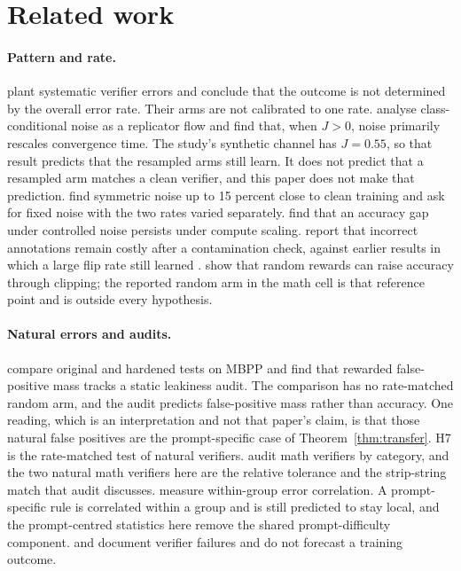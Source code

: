\section{Related work}
\label{sec:related}

\paragraph{Pattern and rate.}
\citet{egashira2026delay} plant systematic verifier errors and conclude that the outcome is not determined by the overall error rate.
Their arms are not calibrated to one rate.
\citet{rad2026rate} analyse class-conditional noise as a replicator flow and find that, when $J > 0$, noise primarily rescales convergence time.
The study's synthetic channel has $J = 0.55$, so that result predicts that the resampled arms still learn.
It does not predict that a resampled arm matches a clean verifier, and this paper does not make that prediction.
\citet{plesner2026noise} find symmetric noise up to 15 percent close to clean training and ask for fixed noise with the two rates varied separately.
\citet{mitsuhashi2026scaling} find that an accuracy gap under controlled noise persists under compute scaling.
\citet{zhu2026incorrect} report that incorrect annotations remain costly after a contamination check, against earlier results in which a large flip rate still learned \citep{lv2025flips}.
\citet{shao2025spurious} show that random rewards can raise accuracy through clipping; the reported random arm in the math cell is that reference point and is outside every hypothesis.

\paragraph{Natural errors and audits.}
\citet{zhang2026leaky} compare original and hardened tests on MBPP and find that rewarded false-positive mass tracks a static leakiness audit.
The comparison has no rate-matched random arm, and the audit predicts false-positive mass rather than accuracy.
One reading, which is an interpretation and not that paper's claim, is that those natural false positives are the prompt-specific case of Theorem~\ref{thm:transfer}.
H7 is the rate-matched test of natural verifiers.
\citet{xin2026audit} audit math verifiers by category, and the two natural math verifiers here are the relative tolerance and the strip-string match that audit discusses.
\citet{xin2026correlation} measure within-group error correlation.
A prompt-specific rule is correlated within a group and is still predicted to stay local, and the prompt-centred statistics here remove the shared prompt-difficulty component.
\citet{ray2026fuzz} and \citet{zhou2026language} document verifier failures and do not forecast a training outcome.

